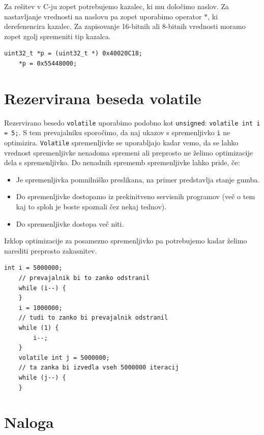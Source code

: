 \documentclass[12pt,letterpaper]{article}
\begin{document}
Za rešitev v C-ju zopet potrebujemo kazalec, ki mu določimo naslov. Za nastavljanje vrednosti na naslovu pa zopet uporabimo operator $*$, ki derefenencira kazalec. Za zapisovanje 16-bitnih ali 8-bitnih vrednosti moramo zopet zgolj spremeniti tip kazalca.

\begin{center}
\begin{lstlisting}[style=CStyle]
    uint32_t *p = (uint32_t *) 0x40020C18;
    *p = 0x55448000;
\end{lstlisting}
\end{center}


\section*{Rezervirana beseda volatile}

Rezervirano besedo \texttt{volatile} uporabimo podobno kot \texttt{unsigned}: \texttt{volatile int i = 5;}. S tem prevajalniku sporočimo, da naj ukazov s spremenljivko \texttt{i} ne optimizira. \texttt{Volatile} spremenljivke se uporabljajo kadar vemo, da se lahko vrednost spremenljivke nenadoma spremeni ali preprosto ne želimo optimizacije dela s spremenljivko. Do nenadnih sprememb spremenljivke lahko pride, če:

\begin{itemize}
    \item Je spremenljivka pomnilniško preslikana, na primer predstavlja stanje gumba.
    \item Do spremenljivke dostopamo iz prekinitveno servisnih programov (več o tem kaj to sploh je boste spoznali čez nekaj tednov).
    \item Do spremenljivke dostopa več niti.
\end{itemize}

Izklop optimizacije za posamezno spremenljivko pa potrebujemo kadar želimo narediti preprosto zakasnitev. 

\begin{center}
\begin{lstlisting}[style=CStyle]
    int i = 5000000;
    // prevajalnik bi to zanko odstranil
    while (i--) {
    }
    i = 1000000;
    // tudi to zanko bi prevajalnik odstranil
    while (1) {
        i--;
    }
    volatile int j = 5000000;
    // ta zanka bi izvedla vseh 5000000 iteracij
    while (j--) {
    }
\end{lstlisting}
\end{center}


\section*{Naloga}
\end{document}
